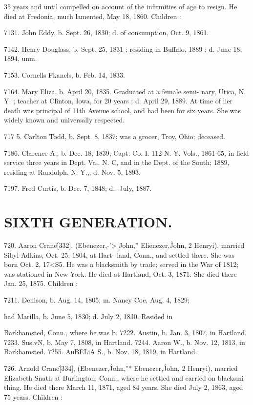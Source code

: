 \documentclass{book}
\begin{document}
35 years and until compelled on account of the infirmities of age 
to resign. He died at Fredonia, much lamented, May 18, 1860. 
Children : 

7131. John Eddy, b. Sept. 26, 1830; d. of consumption, Oct. 9, 
1861. 

7142. Henry Douglass, b. Sept. 25, 1831 ; residing in Buffalo, 1889 ; 
d. June 18, 1894, unm. 

7153. Cornells Fkancls, b. Feb. 14, 1833. 

7164. Mary Eliza, b. April 20, 1835. Graduated at a female semi- 
nary, Utica, N. Y. ; teacher at Clinton, Iowa, for 20 years ; 
d. April 29, 1889. At time of lier death was principal of 
11th Avenue school, and had been for six years. She was 
widely known and universally respected. 

717  5. Carlton Todd, b. Sept. 8, 1837; was a grocer, Troy, Ohio; 
deceased. 

7186. Clarence A., b. Dec. 18, 1839; Capt. Co. I. 112 N. Y. Vols., 
1861-65, in field service three years in Dept. Va., N. C, 
and in the Dept. of the South; 1889, residing at Randolph, 
N. Y.,; d. Nov. 5, 1893. 

7197. Fred Curtis, b. Dec. 7, 1848; d. -July, 1887. 



\section{SIXTH GENERATION.}


720. Aaron Crane\^ [332], (Ebenezer,-'> John,'' Elienezer,\^ 
John, 2 Henryi), married Sibyl Adkins, Oct. 25, 1804, at Hart- 
land, Conn., and settled there. She was born Oct. 2, 17<S5. He 
was a blacksmith by trade; served in the War of 1812; was 
stationed in New York. He died at Hartland, Oct. 3, 1871. 
She died there Jan. 25, 1875. Children : 

7211. Denison, b. Aug. 14, 1805; m. Nancy Coe, Aug. 4, 1829; 

had Marilla, b. June 5, 1830; d. July 2, 1830. Resided in 

Barkhamsted, Conn., where he was b. 
7222. Austin, b. Jan. 3, 1807, in Hartland. 
7233. Sus.vN, b. May 7, 1808, in Hartland. 
7244. Aaron W., b. Nov. 12, 1813, in Barkhamsted. 
7255. AuBELiA S., b. Nov. 18, 1819, in Hartland. 

726. Arnold Crane\^ [334], (Ebenezer,\^ John,"* Ebenezer,\^ 
John, 2 Henryi), married Elizabeth Snath at Burlington, Conn., 
where he settled and carried on blacksmi thing. He died there 
March 11, 1871, aged 84 years. She died July 2, 1863, aged 75 
years. Children : 
\end{document}
